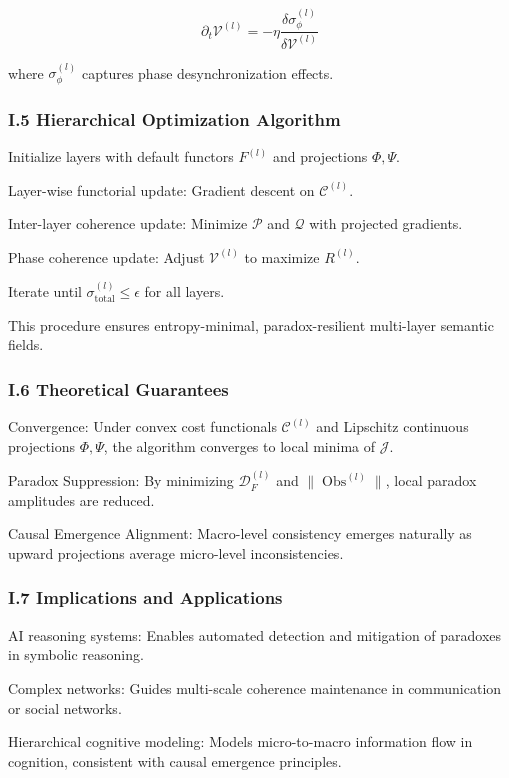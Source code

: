 \documentclass[12pt]{article}
\theoremstyle{plain}
\begin{document}
\begin{equation}
\partial_t \mathcal{V}^{(l)} = - \eta \frac{\delta \sigma_\phi^{(l)}}{\delta \mathcal{V}^{(l)}}
\end{equation}

where \(\sigma_\phi^{(l)}\) captures phase desynchronization effects.

\subsubsection*{I.5 Hierarchical Optimization Algorithm}

Initialize layers with default functors \(F^{(l)}\) and projections \(\Phi, \Psi\).

Layer-wise functorial update: Gradient descent on \(\mathcal{C}^{(l)}\).

Inter-layer coherence update: Minimize \(\mathcal{P}\) and \(\mathcal{Q}\) with projected gradients.

Phase coherence update: Adjust \(\mathcal{V}^{(l)}\) to maximize \(R^{(l)}\).

Iterate until \(\sigma_{\mathrm{total}}^{(l)} \leq \epsilon\) for all layers.

This procedure ensures entropy-minimal, paradox-resilient multi-layer semantic fields.

\subsubsection*{I.6 Theoretical Guarantees}

Convergence: Under convex cost functionals \(\mathcal{C}^{(l)}\) and Lipschitz continuous projections \(\Phi, \Psi\), the algorithm converges to local minima of \(\mathcal{J}\).

Paradox Suppression: By minimizing \(\mathcal{D}_F^{(l)}\) and \(\|\operatorname{Obs}^{(l)}\|\), local paradox amplitudes are reduced.

Causal Emergence Alignment: Macro-level consistency emerges naturally as upward projections average micro-level inconsistencies.

\subsubsection*{I.7 Implications and Applications}

AI reasoning systems: Enables automated detection and mitigation of paradoxes in symbolic reasoning.

Complex networks: Guides multi-scale coherence maintenance in communication or social networks.

Hierarchical cognitive modeling: Models micro-to-macro information flow in cognition, consistent with causal emergence principles.



\end{document}
